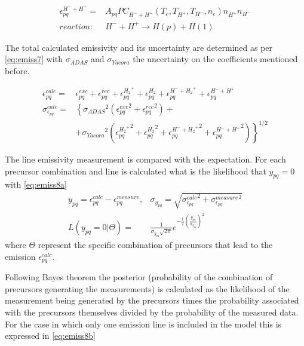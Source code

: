\begin{equation}
\label{eq:emiss6}
\begin{aligned}
\epsilon^{{H}^-{}+{H}^+{}}_{pq} =& A_{pq} PC_{{H}^-{}+{H}^+{}}(T_e,T_{{H}^+{}},T_{{H}^-{}},n_e) n_{{H}^+{}} n_{{H}^-{}} \\
reaction:\ &{H}^-{}+{H}^+{} \rightarrow H(p) + H(1)
\end{aligned}
\end{equation}

The total calculated emissivity and its uncertainty are determined as per \autoref{eq:emiss7} with $\sigma_{ADAS}$ and $\sigma_{Yacora}$ the uncertainty on the coefficients mentioned before.

\begin{equation}
\label{eq:emiss7}
\begin{aligned}
\epsilon^{calc}_{pq} =& \epsilon^{exc}_{pq} + \epsilon^{rec}_{pq} + \epsilon^{{H_2}^+{}}_{pq} + \epsilon^{{H_2}}_{pq} + \epsilon^{{H}^-{}+{H_2}^+{}}_{pq} + \epsilon^{{H}^-{}+{H}^+{}}_{pq}
\\
\sigma^{calc}_{\epsilon_{pq}} =& \left\{ {\sigma_{ADAS}}^2 \left({\epsilon^{exc}_{pq}}^2 + {\epsilon^{rec}_{pq}}^2\right) + \right. \\ &\left. + {\sigma_{Yacora}}^2 \left({\epsilon^{{H_2}^+{}}_{pq}}^2 + {\epsilon^{{H_2}}_{pq}}^2 + {\epsilon^{{H}^-{}+{H_2}^+{}}_{pq}}^2 + {\epsilon^{{H}^-{}+{H}^+{}}_{pq}}^2\right) \right\}^{1/2}
\end{aligned}
\end{equation}

The line emissivity measurement is compared with the expectation. For each precursor combination and line is calculated what is the likelihood that $y_{pq}=0$ with \autoref{eq:emiss8a}
\begin{equation}
\label{eq:emiss8a}
\begin{aligned}
y_{pq} = \epsilon^{calc}_{pq}-\epsilon^{measure}_{pq} ,& \sigma_{y_{pq}} = \sqrt{{\sigma_{\epsilon_{pq}}^{calc}}^2 + {\sigma_{\epsilon_{pq}}^{measure}}^2}
\\
L(y_{pq} = 0|\Theta) =& \frac{1}{\sigma_{y_{pq}} \sqrt{2\pi}} e^{-\frac{1}{2} \left( \frac{y_{pq}}{\sigma_{y_{pq}}} \right)^2 }
\end{aligned}
\end{equation}
where $\Theta$ represent the specific combination of precursors that lead to the emission $\epsilon^{calc}_{pq}$.

Following Bayes theorem the posterior (probability of the combination of precursors generating the measurements) is calculated as the likelihood of the measurement being generated by the precursors times the probability associated with the precursors themselves divided by the probability of the measured data. For the case in which only one emission line is included in the model this is expressed in \autoref{eq:emiss8b}

